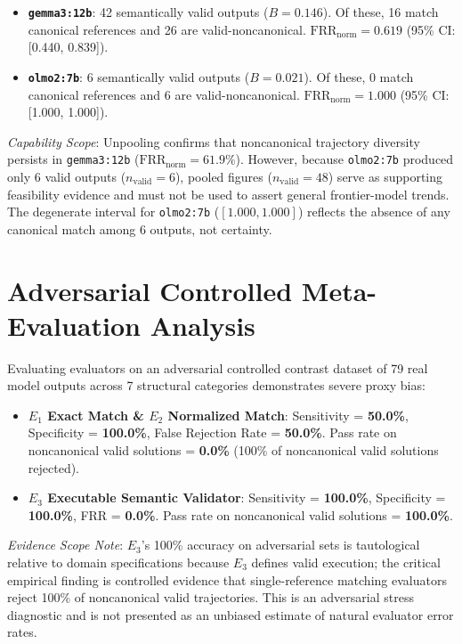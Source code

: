 \documentclass[11pt]{article}
\begin{document}
\begin{itemize}
\item \textbf{\texttt{gemma3:12b}}: 42 semantically valid outputs ($B = 0.146$). Of these, 16 match canonical references and 26 are valid-noncanonical. $\text{FRR}_{\text{norm}} = 0.619$ (95\% CI: [0.440, 0.839]).
\item \textbf{\texttt{olmo2:7b}}: 6 semantically valid outputs ($B = 0.021$). Of these, 0 match canonical references and 6 are valid-noncanonical. $\text{FRR}_{\text{norm}} = 1.000$ (95\% CI: [1.000, 1.000]).
\end{itemize}
\emph{Capability Scope}: Unpooling confirms that noncanonical trajectory diversity persists in \texttt{gemma3:12b} ($\text{FRR}_{\text{norm}} = 61.9\%$). However, because \texttt{olmo2:7b} produced only 6 valid outputs ($n_{\text{valid}} = 6$), pooled figures ($n_{\text{valid}} = 48$) serve as supporting feasibility evidence and must not be used to assert general frontier-model trends. The degenerate interval for \texttt{olmo2:7b} ($[1.000, 1.000]$) reflects the absence of any canonical match among 6 outputs, not certainty.

\section{Adversarial Controlled Meta-Evaluation Analysis}
Evaluating evaluators on an adversarial controlled contrast dataset of 79 real model outputs across 7 structural categories demonstrates severe proxy bias:

\begin{itemize}
\item \textbf{$E_1$ Exact Match \& $E_2$ Normalized Match}: Sensitivity = \textbf{50.0\%}, Specificity = \textbf{100.0\%}, False Rejection Rate = \textbf{50.0\%}. Pass rate on noncanonical valid solutions = \textbf{0.0\%} (100\% of noncanonical valid solutions rejected).
\item \textbf{$E_3$ Executable Semantic Validator}: Sensitivity = \textbf{100.0\%}, Specificity = \textbf{100.0\%}, FRR = \textbf{0.0\%}. Pass rate on noncanonical valid solutions = \textbf{100.0\%}.
\end{itemize}
\emph{Evidence Scope Note}: $E_3$'s 100\% accuracy on adversarial sets is tautological relative to domain specifications because $E_3$ defines valid execution; the critical empirical finding is controlled evidence that single-reference matching evaluators reject 100\% of noncanonical valid trajectories. This is an adversarial stress diagnostic and is not presented as an unbiased estimate of natural evaluator error rates.
\end{document}
